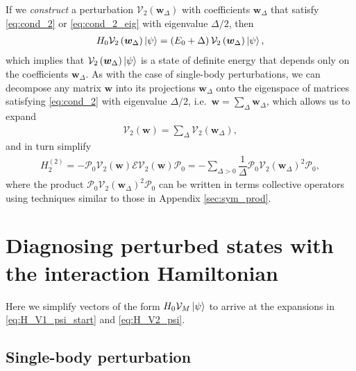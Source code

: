 \documentclass[nofootinbib,notitlepage,11pt]{revtex4-2}
\newcommand{\f}[2]{\dfrac{#1}{#2}} %
\newcommand{\p}[1]{\left(#1\right)} %
\newcommand{\m}{\bm} %
\newcommand{\1}{\mathds{1}}
\newcommand{\E}{\mathcal{E}}
\renewcommand{\P}{\mathcal{P}}
\newcommand{\V}{\mathcal{V}}
\begin{document}
If we {\it construct} a perturbation $\V_2\p{\m w_\Delta}$ with
coefficients $\m w_\Delta$ that satisfy \eqref{eq:cond_2} or
\eqref{eq:cond_2_eig} with eigenvalue $\Delta/2$, then
\begin{align}
  H_0 \V_2\p{\m w_\Delta} \ket\psi
  = \p{E_0 + \Delta} \V_2\p{\m w_\Delta} \ket\psi,
  \label{eq:H_V1_psi}
\end{align}
which implies that $\V_2\p{\m w_\Delta}\ket\psi$ is a state of
definite energy that depends only on the coefficients $\m w_\Delta$.
As with the case of single-body perturbations, we can decompose any
matrix $\m w$ into its projections $\m w_\Delta$ onto the eigenspace
of matrices satisfying \eqref{eq:cond_2} with eigenvalue $\Delta/2$,
i.e.~$\m w=\sum_\Delta\m w_\Delta$, which allows us to expand
\begin{align}
  \V_2\p{\m w} = \sum_\Delta \V_2\p{\m w_\Delta},
\end{align}
and in turn simplify
\begin{align}
  H_2^{(2)} = - \P_0 \V_2\p{\m w} \E \V_2\p{\m w} \P_0
  = -\sum_{\Delta>0} \f1\Delta \P_0 \V_2\p{\m w_\Delta}^2 \P_0,
\end{align}
where the product $\P_0 \V_2\p{\m w_\Delta}^2 \P_0$ can be written in
terms collective operators using techniques similar to those in
Appendix \ref{sec:sym_prod}.

\appendix

\section{Diagnosing perturbed states with the interaction Hamiltonian}

Here we simplify vectors of the form $H_0\V_M\ket\psi$ to arrive at
the expansions in \eqref{eq:H_V1_psi_start} and \eqref{eq:H_V2_psi}.

\subsection{Single-body perturbation}
\label{sec:H_V1_psi}
\end{document}
